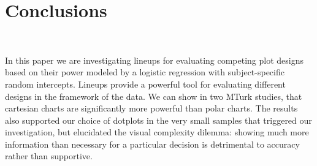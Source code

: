 \section{Conclusions}~\label{conclusions}

%
%
%
%




In this paper we are investigating lineups for evaluating competing plot designs based on their power modeled by a logistic regression with subject-specific random intercepts. 
Lineups provide a powerful  tool for evaluating different designs in the framework of the data. We can show in two MTurk studies, that cartesian charts are significantly more powerful than polar charts. The  results also supported our choice of dotplots in the very small samples that triggered our investigation, but  elucidated the visual complexity dilemma: showing much more information than necessary for a particular decision is detrimental to accuracy rather than supportive. 

